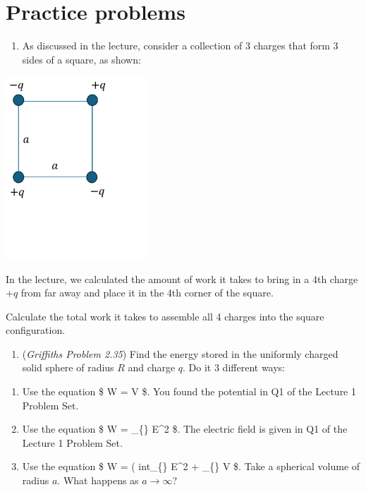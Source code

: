 \documentclass[
  letterpaper,
  DIV=11,
  numbers=noendperiod]{scrreprt}
\providecommand{\tightlist}{%
  \setlength{\itemsep}{0pt}\setlength{\parskip}{0pt}}\usepackage{longtable,booktabs,array}
\begin{document}
\section{Practice problems}\label{practice-problems-2}

\begin{enumerate}
\def\labelenumi{\arabic{enumi})}
\tightlist
\item
  As discussed in the lecture, consider a collection of 3 charges that
  form 3 sides of a square, as shown:
\end{enumerate}

\includegraphics[width=2.08333in,height=\textheight]{Figures/L3_3charges.png}

In the lecture, we calculated the amount of work it takes to bring in a
4th charge \(+q\) from far away and place it in the 4th corner of the
square.

Calculate the total work it takes to assemble all 4 charges into the
square configuration.

\begin{enumerate}
\def\labelenumi{\arabic{enumi})}
\setcounter{enumi}{1}
\tightlist
\item
  (\emph{Griffiths Problem 2.35}) Find the energy stored in the
  uniformly charged solid sphere of radius \(R\) and charge \(q\). Do it
  3 different ways:
\end{enumerate}

\begin{enumerate}
\def\labelenumi{(\alph{enumi})}
\item
  Use the equation \$ W =  \int \rho V  \tau \$.
  You found the potential in Q1 of the Lecture 1 Problem Set.
\item
  Use the equation \$ W = 
  \int\_\{\} E\^{}2  \tau \$. The electric
  field is given in Q1 of the Lecture 1 Problem Set.
\item
  Use the equation \$ W =  \left(
  int\_\{\} E\^{}2  \tau + \oint\_\{\} V
   \cdot {}  \$. Take a
  spherical volume of radius \(a\). What happens as
  \(a \rightarrow \infty\)?
\end{enumerate}
\end{document}
